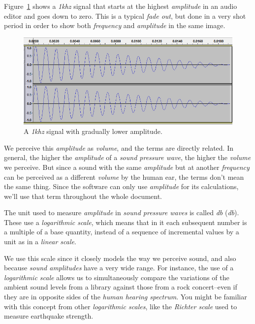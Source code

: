 \documentclass[10pt,a4paper]{report}
\newcommand{\define}[1]{\textit{\acrlong{#1}} (\textit{\acrshort{#1}})}
\newcommand{\khz}[1]{\textit{\mbox{#1\acrshort{khz}}}}
\begin{document}
Figure~\ref{fig:amplitude} shows a \khz{1} signal that starts at the highest \textit{amplitude} in an audio editor and goes down to zero. This is a typical \textit{fade out}, but done in a very shot period in order to show both \textit{frequency} and \textit{amplitude} in the same image.

\begin{figure}[H]
	\centering
	\includegraphics[width=0.8\linewidth]{images/audio/amplitude.png}
	\caption[amplitude]{A \khz{1} signal with gradually lower amplitude.}
	\label{fig:amplitude}
\end{figure}

We perceive this \textit{amplitude} as \textit{volume}, and the terms are directly related. In general, the higher the \textit{amplitude} of a \textit{sound pressure wave}, the higher the \textit{volume} we perceive. But since a sound with the same  \textit{amplitude} but at another \textit{frequency} can be perceived as a different \textit{volume} by the human ear, the terms don't mean the same thing. Since the software can only use \textit{amplitude} for its calculations, we'll use that term throughout the whole document.

The unit used to measure \textit{amplitude} in \textit{sound pressure waves} is called \define{db}. These use a \textit{logarithmic scale}, which means that in it each subsequent number is a multiple of a base quantity, instead of a sequence of incremental values by a unit as in a \textit{linear scale}. 

We use this scale since it closely models the way we perceive sound, and also because \textit{sound amplitudes} have a very wide range. For instance, the use of a \textit{logarithmic scale} allows us to simultaneously compare the variations of the ambient sound levels from a library against those from a rock concert--even if they are in opposite sides of the \textit{human hearing spectrum}. You might be familiar with this concept from other \textit{logarithmic scales}, like the \textit{Richter scale} used to measure earthquake strength.
\end{document}
